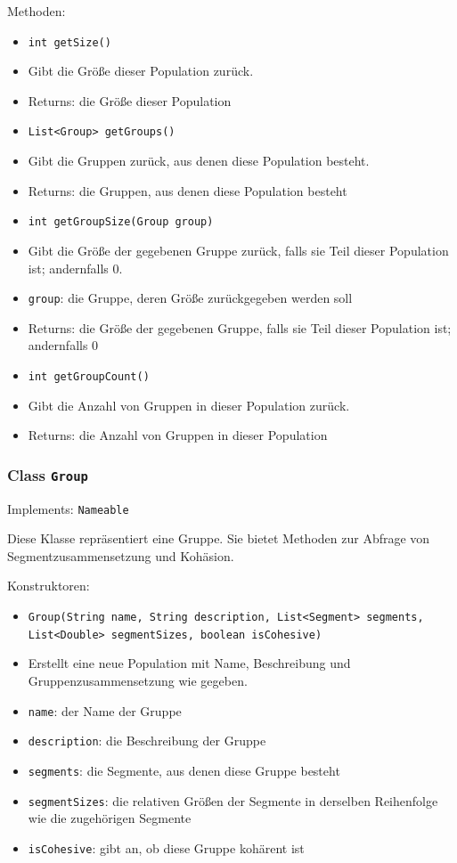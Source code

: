 \documentclass[parskip=full,11pt]{scrartcl}
\begin{document}
Methoden:
\begin{itemize}\itemsep -10pt
\item \texttt{int getSize()}
\item[] Gibt die Größe dieser Population zurück.
\item[] Returns: die Größe dieser Population

\item \texttt{List<Group> getGroups()}
\item[] Gibt die Gruppen zurück, aus denen diese Population besteht.
\item[] Returns: die Gruppen, aus denen diese Population besteht

\item \texttt{int getGroupSize(Group group)}
\item[] Gibt die Größe der gegebenen Gruppe zurück, falls sie Teil dieser Population ist; andernfalls \(0\).
\item[] \texttt{group}: die Gruppe, deren Größe zurückgegeben werden soll
\item[] Returns: die Größe der gegebenen Gruppe, falls sie Teil dieser Population ist; andernfalls \(0\)

\item \texttt{int getGroupCount()}
\item[] Gibt die Anzahl von Gruppen in dieser Population zurück.
\item[] Returns: die Anzahl von Gruppen in dieser Population
\end{itemize}

\subsubsection{Class \texttt{Group}}
Implements: \texttt{Nameable}

Diese Klasse repräsentiert eine Gruppe. Sie bietet Methoden zur Abfrage von Segmentzusammensetzung und Kohäsion.

Konstruktoren:
\begin{itemize}\itemsep -10pt
\item \texttt{Group(String name, String description, List<Segment> segments, List<Double> segmentSizes, boolean isCohesive)}
\item[] Erstellt eine neue Population mit Name, Beschreibung und Gruppenzusammensetzung wie gegeben.
\item[] \texttt{name}: der Name der Gruppe
\item[] \texttt{description}: die Beschreibung der Gruppe
\item[] \texttt{segments}: die Segmente, aus denen diese Gruppe besteht
\item[] \texttt{segmentSizes}: die relativen Größen der Segmente in derselben Reihenfolge wie die zugehörigen Segmente
\item[] \texttt{isCohesive}: gibt an, ob diese Gruppe kohärent ist
\end{itemize}
\end{document}
